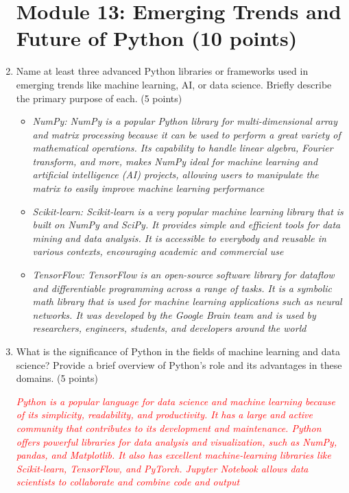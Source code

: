 \documentclass{article}
\begin{document}
\begin{enumerate}
             \section{Module 13: Emerging Trends and Future of Python (10 points)}
             \item Name at least three advanced Python libraries or frameworks used in
             emerging trends like machine learning, AI, or data science. Briefly describe
             the primary purpose of each. (5 points)\par
             \begin{itemize}
                \color{red}
                    \item \textit{NumPy: NumPy is a popular Python library for multi-dimensional array and matrix processing because 
                it can be used to perform a great variety of mathematical operations. Its capability to handle linear algebra, 
                Fourier transform, and more, makes NumPy ideal for machine learning and artificial intelligence (AI) projects, 
                allowing users to manipulate the matrix to easily improve machine learning performance}
                    \item \textit{Scikit-learn: Scikit-learn is a very popular machine learning library that is built on NumPy and SciPy. 
                    It provides simple and efficient tools for data mining and data analysis. It is accessible to everybody and reusable 
                    in various contexts, encouraging academic and commercial use}
                    \item \textit{TensorFlow: TensorFlow is an open-source software library for dataflow and differentiable programming 
                    across a range of tasks. It is a symbolic math library that is used for machine learning applications such as neural networks. 
                    It was developed by the Google Brain team and is used by researchers, engineers, students, and developers around the world}
             \end{itemize}

             \item What is the significance of Python in the fields of machine learning and
             data science? Provide a brief overview of Python’s role and its advantages
             in these domains. (5 points)\par
             \textcolor{red}{\textit{Python is a popular language for data science and machine learning because of its simplicity, readability, 
             and productivity. It has a large and active community that contributes to its development and maintenance. 
             Python offers powerful libraries for data analysis and visualization, such as NumPy, pandas, and Matplotlib. 
             It also has excellent machine-learning libraries like Scikit-learn, TensorFlow, and PyTorch. Jupyter Notebook allows 
             data scientists to collaborate and combine code and output}}

    \end{enumerate}
\end{document}
